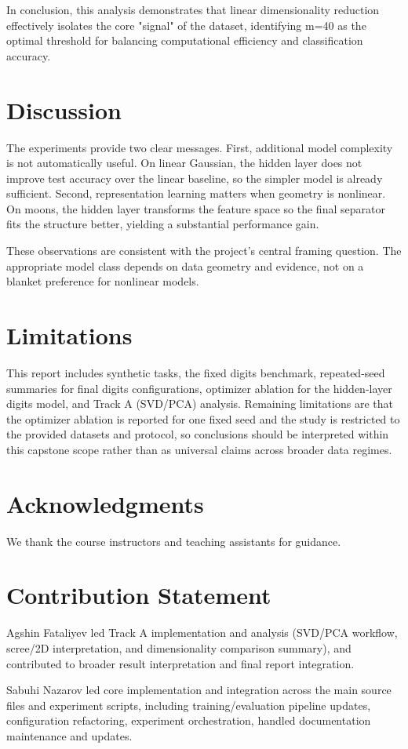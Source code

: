 \documentclass[sigconf,screen,nonacm]{acmart}
\begin{document}
In conclusion, this analysis demonstrates that linear dimensionality reduction effectively isolates the core "signal" of the dataset, identifying m=40 as the optimal threshold for balancing computational efficiency and classification accuracy.

\section{Discussion}
The experiments provide two clear messages. First, additional model complexity is not automatically useful. On linear Gaussian, the hidden layer does not improve test accuracy over the linear baseline, so the simpler model is already sufficient. Second, representation learning matters when geometry is nonlinear. On moons, the hidden layer transforms the feature space so the final separator fits the structure better, yielding a substantial performance gain.

These observations are consistent with the project's central framing question. The appropriate model class depends on data geometry and evidence, not on a blanket preference for nonlinear models.

\section{Limitations}
This report includes synthetic tasks, the fixed digits benchmark, repeated-seed summaries for final digits configurations, optimizer ablation for the hidden-layer digits model, and Track A (SVD/PCA) analysis. Remaining limitations are that the optimizer ablation is reported for one fixed seed and the study is restricted to the provided datasets and protocol, so conclusions should be interpreted within this capstone scope rather than as universal claims across broader data regimes.

\section*{Acknowledgments}
We thank the course instructors and teaching assistants for guidance.




\appendix

\section{Contribution Statement}
Agshin Fataliyev led Track A implementation and analysis (SVD/PCA workflow, scree/2D interpretation, and dimensionality comparison summary), and contributed to broader result interpretation and final report integration.

Sabuhi Nazarov led core implementation and integration across the main source files and experiment scripts, including training/evaluation pipeline updates, configuration refactoring, experiment orchestration, handled documentation maintenance and updates.
\end{document}

